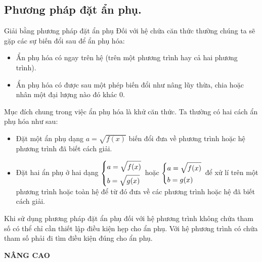 \subsection{Phương pháp đặt ẩn phụ.}
\begin{dang}{Giải bằng phương pháp đặt ẩn phụ}
    Đối với hệ chứa căn thức thường chúng ta sẽ gặp các sự biến đổi sau để ẩn phụ hóa:
    \begin{itemize}
    	\item Ẩn phụ hóa có ngay trên hệ (trên một phương trình hay cả hai phương trình).
    	\item Ẩn phụ hóa có được sau một phép biến đổi như nâng lũy thừa, chia hoặc nhân một đại lượng nào đó khác 0.
    \end{itemize}
    Mục đích chung trong việc ẩn phụ hóa là khử căn thức. Ta thường có hai cách ẩn phụ hóa như sau:
    \begin{itemize}
    	\item Đặt một ẩn phụ dạng $a = \sqrt{f(x)}$ biến đổi đưa về phương trình hoặc hệ phương trình đã biết cách giải.
    	\item Đặt hai ẩn phụ ở hai dạng $\left\{\begin{aligned}&a = \sqrt{f(x)} \\&b = \sqrt{g(x)}\end{aligned}\right.$ hoặc $\left\{\begin{aligned}&a = \sqrt{f(x)} \\&b = g(x)\end{aligned}\right.$ để xử lí trên một phương trình hoặc toàn hệ để từ đó đưa về các phương trình hoặc hệ đã biết cách giải.
    \end{itemize}
    \begin{note}
    	Khi sử dụng phương pháp đặt ẩn phụ đối với hệ phương trình không chứa tham số có thể chỉ cần thiết lập điều kiện hẹp cho ẩn phụ. Với hệ phương trình có chứa tham số phải đi tìm điều kiện đúng cho ẩn phụ.
    \end{note}
\end{dang}
\begin{center}
  \textbf{NÂNG CAO} 
  \end{center}
